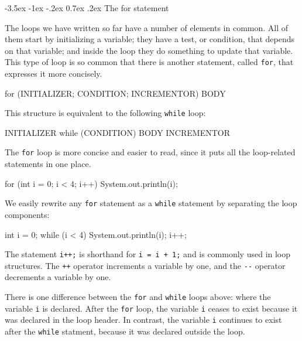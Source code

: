 \documentclass[12pt]{book}
\makeatletter
\theoremstyle{exercise}
\newcommand{\java}[1]{\verb"#1"}
\renewcommand{\section}{\@startsection {section}{1}{\z@}%
    {-3.5ex \@plus -1ex \@minus -.2ex}%
    {0.7ex \@plus.2ex}%
    {\normalfont\Large\bfseries}}
\newcommand{\java}[1]{\lstinline{#1}} %
\makeatother
\begin{document}
\section{The for statement}
\label{for}


The loops we have written so far have a number of elements in common.
All of them start by initializing a variable; they have a test, or condition, that depends on that variable; and inside the loop they do something to update that variable.
This type of loop is so common that there is another statement, called \java{for}, that expresses it more concisely.

\begin{code}
    for (INITIALIZER; CONDITION; INCREMENTOR) {
        BODY
    }
\end{code}

This structure is equivalent to the following \java{while} loop:

\begin{code}
    INITIALIZER
    while (CONDITION) {
        BODY
        INCREMENTOR
    }
\end{code}

The \java{for} loop is more concise and easier to read, since it puts all the loop-related statements in one place.

\begin{code}
    for (int i = 0; i < 4; i++) {
        System.out.println(i);
    }
\end{code}

We easily rewrite any \java{for} statement as a \java{while} statement by separating the loop components:

\begin{code}
    int i = 0;
    while (i < 4) {
        System.out.println(i);
        i++;
    }
\end{code}

The statement \java{i++;} is shorthand for \java{i = i + 1;} and is commonly used in loop structures.
The \java{++} operator increments a variable by one, and the \java{--} operator decrements a variable by one.

There is one difference between the \java{for} and \java{while} loops above: where the variable \java{i} is declared.
After the \java{for} loop, the variable \java{i} ceases to exist because it was declared in the loop header.
In contrast, the variable \java{i} continues to exist after the \java{while} statment, because it was declared outside the loop.
\end{document}
